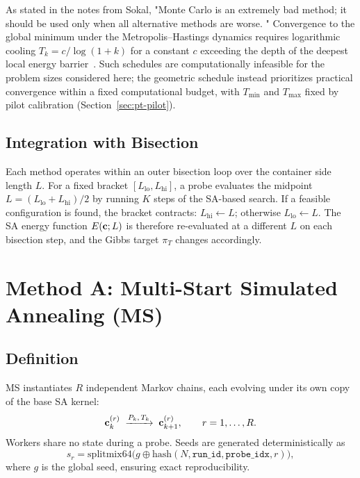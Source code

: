 As stated in the notes from Sokal, "Monte Carlo is an extremely bad method; it should be used only when all alternative methods are 
worse. "
Convergence to the global minimum under the Metropolis--Hastings dynamics
requires logarithmic cooling $T_k = c / \log(1 + k)$ for a constant $c$
exceeding the depth of the deepest local energy barrier~\cite{Hajek1988}.
Such schedules are computationally infeasible for the problem sizes considered
here; the geometric schedule instead prioritizes practical convergence within
a fixed computational budget, with $T_{\min}$ and $T_{\max}$ fixed by
pilot calibration (Section~\ref{sec:pt-pilot}).



\subsection{Integration with Bisection}

Each method operates within an outer bisection loop over the container
side length $L$. For a fixed bracket $[L_{\mathrm{lo}}, L_{\mathrm{hi}}]$,
a probe evaluates the midpoint $L = (L_{\mathrm{lo}} + L_{\mathrm{hi}})/2$
by running $K$ steps of the SA-based search.
If a feasible configuration is found, the bracket contracts:
$L_{\mathrm{hi}} \leftarrow L$; otherwise $L_{\mathrm{lo}} \leftarrow L$.
The SA energy function $E(\mathbf{c}; L)$ is therefore re-evaluated at a
different $L$ on each bisection step, and the Gibbs target $\pi_T$
changes accordingly.

\section{Method A: Multi-Start Simulated Annealing (MS)}
\label{sec:ms}

\subsection{Definition}

MS instantiates $R$ independent Markov chains, each evolving under its
own copy of the base SA kernel:
\[
  \mathbf{c}_k^{(r)} \;\xrightarrow{P_k,\, T_k}\; \mathbf{c}_{k+1}^{(r)},
  \qquad r = 1, \dots, R.
\]
Workers share no state during a probe. Seeds are generated deterministically as
\[
  s_r = \mathrm{splitmix64}\!\bigl(
    g \oplus \mathrm{hash}(N, \texttt{run\_id}, \texttt{probe\_idx}, r)
  \bigr),
\]
where $g$ is the global seed, ensuring exact reproducibility.

